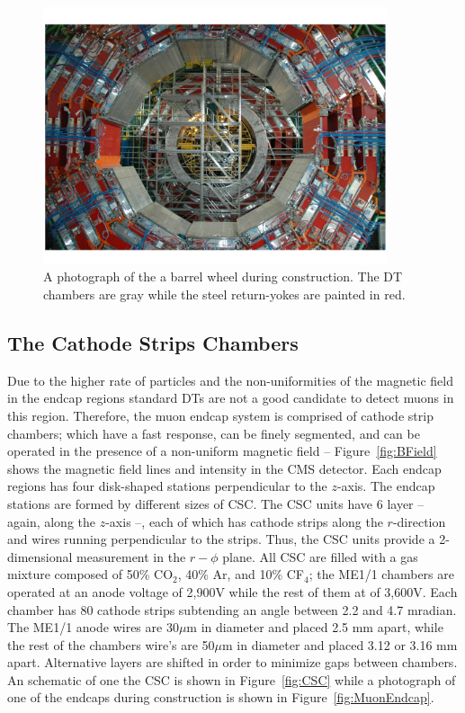 \begin{figure}
 \centering
\includegraphics[width=0.9\textwidth]{CMS_DetectorFigures/MuonSystemBarrel.pdf}
\caption{A photograph of the a barrel wheel during construction. The
  DT chambers are gray while the 
  steel return-yokes are painted in red.\label{fig:BarrelWheel}}
\end{figure}
\subsection{The Cathode Strips Chambers}
Due to the higher rate of particles and the non-uniformities of the
magnetic field in the endcap regions standard DTs are not a good
candidate to detect muons in this region. Therefore, the muon endcap
system is comprised of cathode strip chambers; which have a fast
response, can be finely segmented, and can be operated in the presence
of a non-uniform magnetic field -- Figure~\ref{fig:BField} shows the
magnetic field lines and intensity in the CMS detector. Each endcap
regions has four disk-shaped stations perpendicular to the
$z$-axis. The endcap stations are formed by different sizes of
CSC. The CSC units have 6 layer -- again, along the $z$-axis --, each
of which has cathode strips along the $r$-direction and wires running
perpendicular to the strips. Thus, the CSC units provide a
2-dimensional measurement in the $r-\phi$ plane. All CSC are filled
with a gas mixture composed of 50\% CO$_{2}$, 40\% Ar, and 10\%
CF$_{4}$; the ME1/1 chambers are operated at an anode voltage of
2,900\unit{V} while the rest of them at of 3,600\unit{V}. Each chamber
has 80 cathode strips subtending an angle between 2.2 and 4.7
mradian. The ME1/1 anode wires are 30$\mu$m in diameter and placed 2.5
mm apart, while the rest of the chambers wire's are 50$\mu$m in
diameter and placed 3.12 or 3.16
mm apart. Alternative layers are shifted in order to minimize gaps
between chambers. An schematic of one the CSC is shown in
Figure~\ref{fig:CSC} while a photograph of one of the endcaps during
construction is shown in Figure~\ref{fig:MuonEndcap}.

